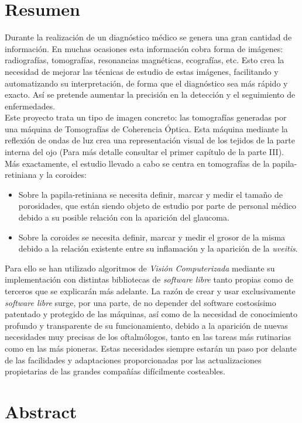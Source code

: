 \section*{Resumen}
Durante la realización de un diagnóstico médico se genera una gran
cantidad de información. En muchas ocasiones esta información cobra
forma de imágenes: radiografías, tomografías, resonancias magnéticas,
ecografías, etc. Esto crea la necesidad de mejorar las técnicas de
estudio de estas imágenes, facilitando y automatizando su
interpretación, de forma que el diagnóstico sea más rápido y
exacto. Así se pretende aumentar la precisión en la detección y el
seguimiento de enfermedades.\\
Este proyecto trata un tipo de imagen concreto: las tomografías
generadas por una máquina de Tomografías de Coherencia Óptica. Esta
máquina mediante la reflexión de ondas de luz crea una representación
visual de los tejidos de la parte interna del ojo (Para más detalle
consultar el primer capítulo de la parte III). Más exactamente, el
estudio llevado a cabo se centra en tomografías de la \gls{papila-retiniana}
y la \gls{coroides}:
\begin{itemize}
\item Sobre la \gls{papila-retiniana} se necesita definir, marcar y medir el
  tamaño de porosidades, que están siendo objeto de estudio por parte
  de personal médico debido a su posible relación con la aparición del
  \gls{glaucoma}.
\item Sobre la \gls{coroides} se necesita definir, marcar y medir el grosor
  de la misma debido a la relación existente entre su inflamación y la
  aparición de la \emph{\gls{uveitis}}.
\end{itemize}
Para ello se han utilizado algoritmos de \emph{Visión Computerizada}
mediante su implementación con distintas bibliotecas de \emph{software
  libre} tanto propias como de terceros que se explicarán más
adelante. La razón de crear y usar exclusivamente \emph{software
  libre} surge, por una parte, de no depender del software costosísimo
patentado y protegido de las máquinas, así como de la necesidad de
conocimiento profundo y transparente de su funcionamiento, debido a la
aparición de nuevas necesidades muy precisas de los oftalmólogos,
tanto en las tareas más rutinarias como en las más pioneras. Estas
necesidades siempre estarán un paso por delante de las facilidades y
adaptaciones proporcionadas por las actualizaciones propietarias de
las grandes compañías difícilmente costeables.
\newpage
\section*{Abstract}

